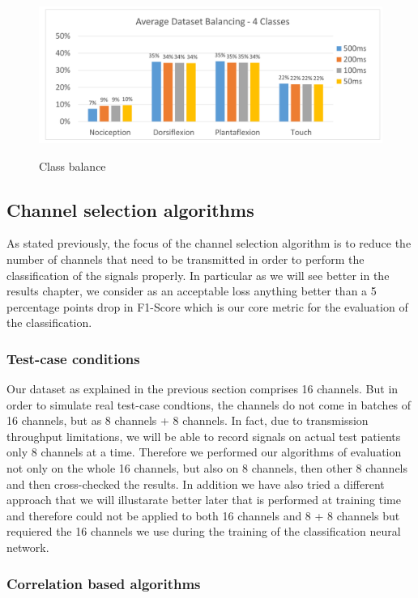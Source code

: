 \documentclass{Configuration_Files/PoliMi3i_thesis}
\begin{document}
\begin{figure}[H]
	\includegraphics[scale=0.4]{balanceClass.png}
	\centering
    \label{Class balance}
    \caption{Class balance}
	\end{figure}
	

\subsection{Channel selection algorithms}

As stated previously, the focus of the channel selection algorithm is to reduce the number of channels that need to be transmitted in order to perform the classification of the signals properly.
In particular as we will see better in the results chapter, we consider as an acceptable loss anything better than a 5 percentage points drop in F1-Score which is our core metric for the evaluation of the classification.

\subsubsection{Test-case conditions}

Our dataset as explained in the previous section comprises 16 channels.
But in order to simulate real test-case condtions, the channels do not come in batches of 16 channels, but as 8 channels + 8 channels.
In fact, due to transmission throughput limitations, we will be able to record signals on actual test patients only 8 channels at a time.
Therefore we performed our algorithms of evaluation not only on the whole 16 channels, but also on 8 channels, then other 8 channels and then cross-checked the results.
In addition we have also tried a different approach that we will illustarate better later that is performed at training time and therefore could not be applied to both 16 channels and 8 + 8 channels but requiered the 16 channels we use during the training of the classification neural network.

\subsubsection{Correlation based algorithms}
\end{document}
